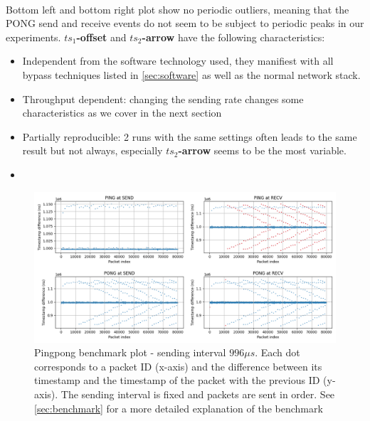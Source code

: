 \documentclass{article}
\begin{document}
\paragraph*{} Bottom left and bottom right plot show no periodic outliers, 
meaning that the PONG send and receive events do not seem to be subject to
periodic peaks in our experiments. \textbf{$ts_1$-offset} and 
\textbf{$ts_2$-arrow} have the following characteristics:

\begin{itemize}
  \item Independent from the software technology used, they manifiest with all 
  bypass techniques listed in \autoref{sec:software} as well as the normal 
  network stack. 
  \item Throughput dependent: changing the sending rate changes some 
  characteristics as we cover in the next section
  \item Partially reproducible: 2 runs with the same settings often leads to the same
  result but not always, especially \textbf{$ts_2$-arrow} seems to be the most
  variable. 
  \item 
\end{itemize}



\begin{figure}
  \centering
  \includegraphics[width=\textwidth]{fig/xsk_80k_996us_powermax.png}
  \caption{Pingpong benchmark plot - sending interval $996\mu s$. Each dot corresponds 
  to a packet ID (x-axis) and the difference between its timestamp and the timestamp 
  of the packet with the previous ID (y-axis). The sending interval is fixed and 
  packets are sent in order. See \autoref{sec:benchmark} for a more detailed
  explanation of the benchmark}
  \label{fig:1}
\end{figure}
\end{document}

